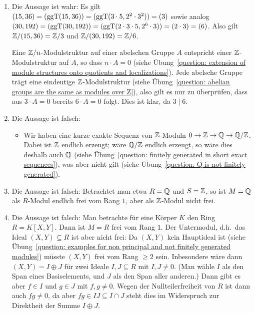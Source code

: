 \begin{solution}
  \begin{enumerate}
    \item
      Die Aussage ist wahr:
      Es gilt $(15,36) = (\operatorname{ggT}(15,36)) = (\operatorname{ggT}(3 \cdot 5, 2^2 \cdot 3^2)) = (3)$ sowie analog $(30,192)  = (\operatorname{ggT}(30,192)) = (\operatorname{ggT}(2 \cdot 3 \cdot 5, 2^6 \cdot 3)) = (2 \cdot 3) = (6)$.
      Also gilt $\mathbb{Z}/(15,36) = \mathbb{Z}/3$ und $\mathbb{Z}/(30,192) = \mathbb{Z}/6$.
      
      Eine $\mathbb{Z}/n$-Modulstruktur auf einer abelschen Gruppe $A$ entspricht einer $\mathbb{Z}$-Modulstruktur auf $A$, so dass $n \cdot A = 0$ (siehe Übung~\ref{question: extension of module structures onto quotients and localizations}).
      Jede abelsche Gruppe trägt eine eindeutige $\mathbb{Z}$-Modulstruktur (siehe Übung~\ref{question: abelian groups are the same as modules over Z}), also gilt es nur zu überprüfen, dass aus $3 \cdot A = 0$ bereits $6 \cdot A = 0$ folgt.
      Dies ist klar, da $3 \mid 6$.

    \item
      Die Aussage ist falsch:
      \begin{itemize}
        \item
          Wir haben eine kurze exakte Sequenz von $\mathbb{Z}$-Moduln $0 \to \mathbb{Z} \to \mathbb{Q} \to \mathbb{Q}/\mathbb{Z}$.
          Dabei ist $\mathbb{Z}$ endlich erzeugt;
          wäre $\mathbb{Q}/\mathbb{Z}$ endlich erzeugt, so wäre dies deshalb auch $\mathbb{Q}$ (siehe Übung~\ref{question: finitely generated in short exact sequences}), was aber nicht gilt (siehe Übung~\ref{question: Q is not finitely generated}).
      \end{itemize}
      
    \item
      Die Aussage ist falsch:
      Betrachtet man etwa $R = \mathbb{Q}$ und $S = \mathbb{Z}$, so ist $M = \mathbb{Q}$ als $R$-Modul endlich frei vom Rang $1$, aber als $\mathbb{Z}$-Modul nicht frei.
      
    \item
      Die Aussage ist falsch:
      Man betrachte für eine Körper $K$ den Ring $R = K[X,Y]$.
      Dann ist $M = R$ frei vom Rang $1$.
      Der Untermodul, d.h.\ das Ideal $(X,Y) \subseteq R$ ist aber nicht frei:
      Da $(X,Y)$ kein Hauptideal ist (siehe Übung~\ref{question: examples for non principal and not finitely generated modules}) müsste $(X,Y)$ frei vom Rang $\geq 2$ sein.
      Inbesondere wäre dann $(X,Y) = I \oplus J$ für zwei Ideale $I, J \subseteq R$ mit $I, J \neq 0$.
      (Man wähle $I$ als den Span eines Basiselements, und $J$ als den Span aller anderen.)
      Dann gibt es aber $f \in I$ und $g \in J$ mit $f, g \neq 0$.
      Wegen der Nullteilerfreiheit von $R$ ist dann auch $fg \neq 0$, da aber $fg \in IJ \subseteq I \cap J$ steht dies im Widerspruch zur Direktheit der Summe $I \oplus J$.
      

\end{enumerate}
\end{solution}
